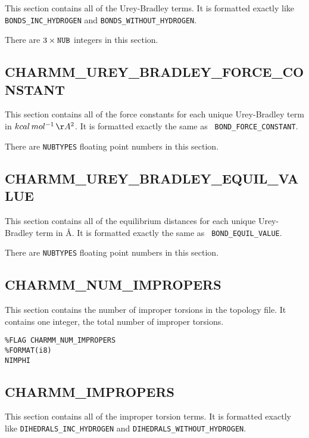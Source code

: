 This section contains all of the Urey-Bradley terms. It is formatted exactly
like {\tt BONDS\_INC\_HYDROGEN} and {\tt BONDS\_WITHOUT\_HYDROGEN}.


\noindent There are $3 \times {\tt NUB}$ integers in this section.

\subsection*{CHARMM\_UREY\_BRADLEY\_FORCE\_CONSTANT}

This section contains all of the force constants for each unique Urey-Bradley
term in $kcal\, mol^{-1}\, \AA^2$. It is formatted exactly the same as {\tt
BOND\_FORCE\_CONSTANT}.


\noindent There are {\tt NUBTYPES} floating point numbers in this section.

\subsection*{CHARMM\_UREY\_BRADLEY\_EQUIL\_VALUE}

This section contains all of the equilibrium distances for each unique
Urey-Bradley term in \AA. It is formatted exactly the same as {\tt
BOND\_EQUIL\_VALUE}.


\noindent There are {\tt NUBTYPES} floating point numbers in this section.

\subsection*{CHARMM\_NUM\_IMPROPERS}

This section contains the number of improper torsions in the topology file.
It contains one integer, the total number of improper torsions.

\begin{verbatim}
%FLAG CHARMM_NUM_IMPROPERS
%FORMAT(i8)
NIMPHI
\end{verbatim}

\subsection*{CHARMM\_IMPROPERS}

This section contains all of the improper torsion terms. It is formatted exactly
like {\tt DIHEDRALS\_INC\_HYDROGEN} and {\tt DIHEDRALS\_WITHOUT\_HYDROGEN}.

